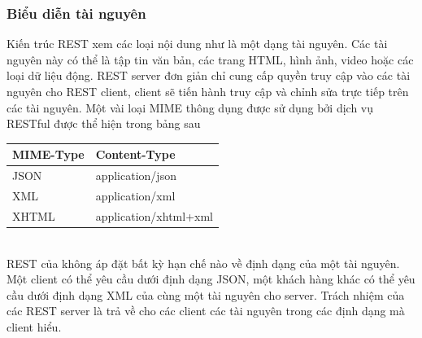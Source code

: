 \documentclass[a4paper]{article}
\begin{document}
\subsubsection{Biểu diễn tài nguyên}
Kiến trúc REST xem các loại nội dung như là một dạng tài nguyên. Các tài nguyên này có thể là tập tin văn bản, các trang HTML, hình ảnh, video hoặc các loại dữ liệu động. REST server đơn giản chỉ cung cấp quyền truy cập vào các tài nguyên cho REST client, client sẽ tiến hành truy cập và chỉnh sửa trực tiếp trên các tài nguyên. Một vài loại MIME thông dụng được sử dụng bởi dịch vụ RESTful được thể hiện trong bảng sau 
\begin{table}[h]
        \centering
            \begin{tabular}{|l|l|}
            \hline
            \textbf{MIME-Type} & \textbf{Content-Type}\\
            \hline
            JSON & application/json \\
            \hline
            XML & application/xml \\
            \hline
            XHTML & application/xhtml+xml \\
            \hline
            \end{tabular}
\end{table}  
\\
REST của không áp đặt bất kỳ hạn chế nào về định dạng của một tài nguyên. Một client có thể yêu cầu dưới định dạng JSON, một khách hàng khác có thể yêu cầu dưới định dạng XML của cùng một tài nguyên cho server. Trách nhiệm của các  REST server là trả về cho các client các tài nguyên trong các định dạng mà client hiểu.
\end{document}
